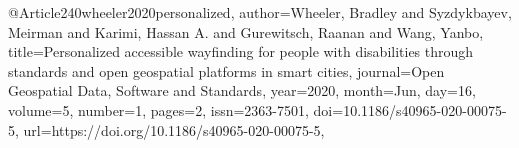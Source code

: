 @Article{240wheeler2020personalized,
author={Wheeler, Bradley
and Syzdykbayev, Meirman
and Karimi, Hassan A.
and Gurewitsch, Raanan
and Wang, Yanbo},
title={Personalized accessible wayfinding for people with disabilities through standards and open geospatial platforms in smart cities},
journal={Open Geospatial Data, Software and Standards},
year={2020},
month={Jun},
day={16},
volume={5},
number={1},
pages={2},
issn={2363-7501},
doi={10.1186/s40965-020-00075-5},
url={https://doi.org/10.1186/s40965-020-00075-5},
}
